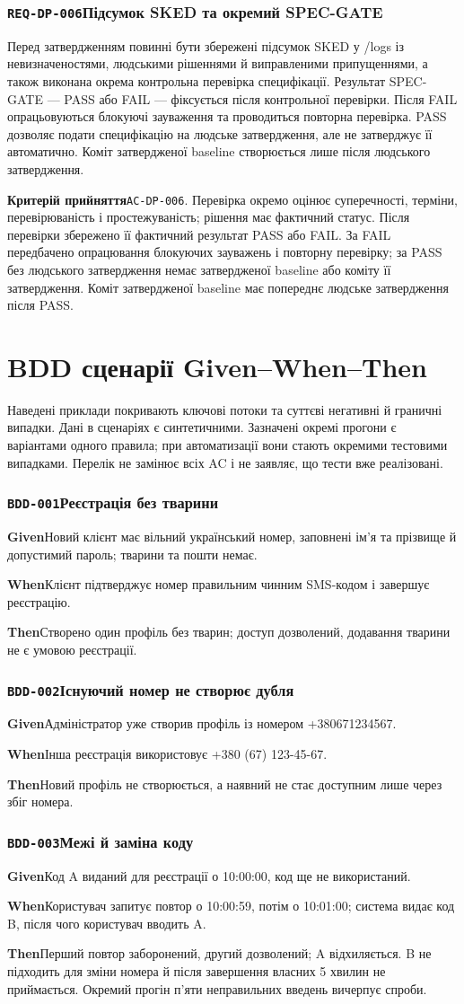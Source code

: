 \documentclass[11pt,a4paper]{article}
\newcommand{\requirement}[4]{%
  \Needspace{7\baselineskip}%
  \subsubsection*{\hypertarget{#1}{\texttt{#1}}\quad #2}%
  #3\par
  \textbf{Критерій прийняття}\quad #4\par\medskip}
\newcommand{\scenario}[5]{%
  \Needspace{8\baselineskip}%
  \subsubsection*{\hypertarget{#1}{\texttt{#1}}\quad #2}%
  \textbf{Given}\quad #3\par
  \textbf{When}\quad #4\par
  \textbf{Then}\quad #5\par\medskip}
\begin{document}
\requirement{REQ-DP-006}{Підсумок SKED та окремий SPEC-GATE}{Перед затвердженням повинні бути збережені підсумок SKED у /logs із невизначеностями, людськими рішеннями й виправленими припущеннями, а також виконана окрема контрольна перевірка специфікації. Результат SPEC-GATE — PASS або FAIL — фіксується після контрольної перевірки. Після FAIL опрацьовуються блокуючі зауваження та проводиться повторна перевірка. PASS дозволяє подати специфікацію на людське затвердження, але не затверджує її автоматично. Коміт затвердженої baseline створюється лише після людського затвердження.}{\hypertarget{AC-DP-006}{\texttt{AC-DP-006}}. Перевірка окремо оцінює суперечності, терміни, перевірюваність і простежуваність; рішення має фактичний статус. Після перевірки збережено її фактичний результат PASS або FAIL. За FAIL передбачено опрацювання блокуючих зауважень і повторну перевірку; за PASS без людського затвердження немає затвердженої baseline або коміту її затвердження. Коміт затвердженої baseline має попереднє людське затвердження після PASS.}

\section{BDD сценарії Given–When–Then}
Наведені приклади покривають ключові потоки та суттєві негативні й граничні випадки. Дані в сценаріях є синтетичними. Зазначені окремі прогони є варіантами одного правила; при автоматизації вони стають окремими тестовими випадками. Перелік не замінює всіх AC і не заявляє, що тести вже реалізовані.

\scenario{BDD-001}{Реєстрація без тварини}{Новий клієнт має вільний український номер, заповнені ім’я та прізвище й допустимий пароль; тварини та пошти немає.}{Клієнт підтверджує номер правильним чинним SMS-кодом і завершує реєстрацію.}{Створено один профіль без тварин; доступ дозволений, додавання тварини не є умовою реєстрації.}

\scenario{BDD-002}{Існуючий номер не створює дубля}{Адміністратор уже створив профіль із номером +380671234567.}{Інша реєстрація використовує +380 (67) 123-45-67.}{Новий профіль не створюється, а наявний не стає доступним лише через збіг номера.}

\scenario{BDD-003}{Межі й заміна коду}{Код A виданий для реєстрації о 10:00:00, код ще не використаний.}{Користувач запитує повтор о 10:00:59, потім о 10:01:00; система видає код B, після чого користувач вводить A.}{Перший повтор заборонений, другий дозволений; A відхиляється. B не підходить для зміни номера й після завершення власних 5 хвилин не приймається. Окремий прогін п’яти неправильних введень вичерпує спроби.}
\end{document}
